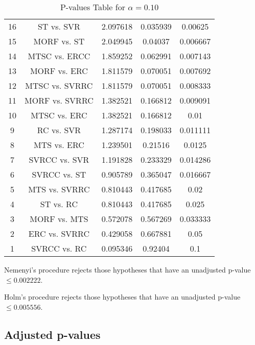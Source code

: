 \documentclass[a4paper,10pt]{article}
\begin{document}
\begin{landscape}
\begin{table}[!htp]
\begin{tabular}{ccccc}
16&ST vs. SVR&2.097618&0.035939&0.00625\\
15&MORF vs. ST&2.049945&0.04037&0.006667\\
14&MTSC vs. ERCC&1.859252&0.062991&0.007143\\
13&MORF vs. ERC&1.811579&0.070051&0.007692\\
12&MTSC vs. SVRRC&1.811579&0.070051&0.008333\\
11&MORF vs. SVRRC&1.382521&0.166812&0.009091\\
10&MTSC vs. ERC&1.382521&0.166812&0.01\\
9&RC vs. SVR&1.287174&0.198033&0.011111\\
8&MTS vs. ERC&1.239501&0.21516&0.0125\\
7&SVRCC vs. SVR&1.191828&0.233329&0.014286\\
6&SVRCC vs. ST&0.905789&0.365047&0.016667\\
5&MTS vs. SVRRC&0.810443&0.417685&0.02\\
4&ST vs. RC&0.810443&0.417685&0.025\\
3&MORF vs. MTS&0.572078&0.567269&0.033333\\
2&ERC vs. SVRRC&0.429058&0.667881&0.05\\
1&SVRCC vs. RC&0.095346&0.92404&0.1\\
\hline
\end{tabular}
\caption{P-values Table for $\alpha=0.10$}
\end{table}Nemenyi's procedure rejects those hypotheses that have an unadjusted p-value $\le0.002222$.

Holm's procedure rejects those hypotheses that have an unadjusted p-value $\le0.005556$.

\pagebreak

\subsection{Adjusted p-values}


\end{landscape}
\end{document}
